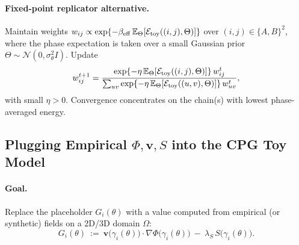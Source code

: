 \documentclass[a4paper,11pt]{article}
\begin{document}
\paragraph{Fixed-point replicator alternative.}
Maintain weights $w_{ij}\propto \exp\{-\beta_{\rm eff}\,\mathbb{E}_{\Theta}[\mathcal{E}_{\rm toy}((i,j),\Theta)]\}$ over $(i,j)\in\{A,B\}^2$, where the phase expectation is taken over a small Gaussian prior $\Theta\sim \mathcal{N}(0,\sigma_\theta^2 I)$. Update
\[
w_{ij}^{t+1}=\frac{\exp\{-\eta\,\mathbb{E}_{\Theta}[\mathcal{E}_{\rm toy}((i,j),\Theta)]\}\,w_{ij}^{t}}{\sum_{uv}\exp\{-\eta\,\mathbb{E}_{\Theta}[\mathcal{E}_{\rm toy}((u,v),\Theta)]\}\,w_{uv}^{t}},
\]
with small $\eta>0$. Convergence concentrates on the chain(s) with lowest phase-averaged energy.

\subsection{Plugging Empirical $\Phi,\mathbf v,S$ into the CPG Toy Model}
\label{sec:empirical-fields}

\paragraph{Goal.} Replace the placeholder $G_i(\theta)$ with a value computed from
empirical (or synthetic) fields on a 2D/3D domain $\Omega$:
\[
G_i(\theta)\ :=\ \mathbf v\big(\gamma_i(\theta)\big)\cdot \nabla \Phi\big(\gamma_i(\theta)\big)\ -\ \lambda_S\,S\big(\gamma_i(\theta)\big).
\]
\end{document}
